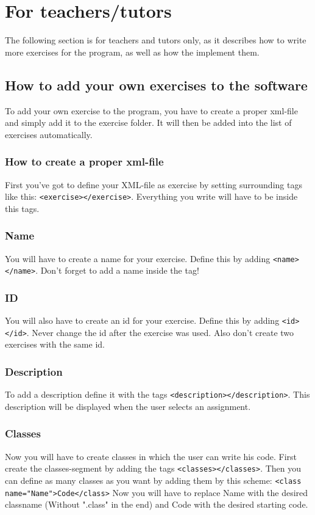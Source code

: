 \documentclass[10pt,a4paper]{article}
\begin{document}
\section{For teachers/tutors}
The following section is for teachers and tutors only, as it describes how to write more exercises for the program, as well as how the implement them.
\subsection{How to add your own exercises to the software}
To add your own exercise to the program, you have to create a proper xml-file and simply add it to the exercise folder. It will then be added into the list of exercises automatically.
\subsubsection{How to create a proper xml-file}
First you've got to define your XML-file as exercise by setting surrounding tags like this: 
\texttt{<exercise></exercise>}. Everything you write will have to be inside this tags.
\subsubsection{Name}
You will have to create a name for your exercise. Define this by adding \texttt{<name></name>}. Don't forget to add a name inside the tag!
\subsubsection{ID}
You will also have to create an id for your exercise. Define this by adding \texttt{<id></id>}. Never change the id  after the exercise was used. Also don't create two exercises with the same id.
\subsubsection{Description}
To add a description define it with the tags \texttt{<description></description>}. This description will be displayed when the user selects an assignment.
\subsubsection{Classes}
Now you will have to create classes in which the user can write his code. First create the classes-segment by adding the tags \texttt{<classes></classes>}. \newline
Then you can define as many classes as you want by adding them by this scheme: \newline
\texttt{<class name="Name">Code</class>} Now you will have to replace Name with the desired classname (Without ".class" in the end) and Code with the desired starting code.
\end{document}
